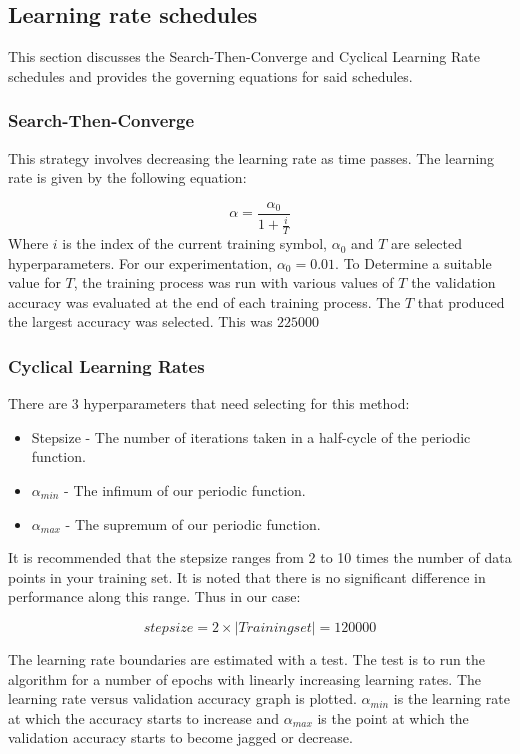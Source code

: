\documentclass{article}
\begin{document}
\subsection{Learning rate schedules}

This section discusses the Search-Then-Converge and Cyclical Learning Rate schedules and provides the governing equations for said schedules.


\subsubsection{Search-Then-Converge}
This strategy involves decreasing the learning rate as time passes. The learning rate is given by the following equation:

\begin{equation}
	\alpha = \frac{\alpha_0}{1 + \frac{i}{T}}
\end{equation}
Where $i$ is the index of the current training symbol, $\alpha_0$ and $T$ are selected hyperparameters. For our experimentation, $\alpha_0 = 0.01$. To Determine a suitable value for $T$,  the training process was run with various values of $T$ the validation accuracy was evaluated at the end of each training process. The $T$ that produced the largest accuracy was selected. This was $225000$  
\subsubsection{Cyclical Learning Rates}
There are 3 hyperparameters that need selecting for this method:
\begin{itemize}
	\item Stepsize - The number of iterations taken in a half-cycle of the periodic function.
	\item $\alpha_{min}$ - The infimum of our periodic function.
	\item $\alpha_{max}$ - The supremum of our periodic function.
\end{itemize}

It is recommended that the stepsize ranges from 2 to 10 times the number of data points in your training set. It is noted that there is no significant difference in performance along this range.
Thus in our case:

\begin{equation}
stepsize = 2 \times |Training set| = 120000
\end{equation}

The learning rate boundaries are estimated with a test. The test is to run the algorithm for a number of epochs with linearly increasing learning rates. The learning rate versus validation accuracy graph is plotted. $\alpha_{min}$ is the learning rate at which the accuracy starts to increase and $\alpha_{max}$ is the point at which the validation accuracy starts to become jagged or decrease.
\end{document}
